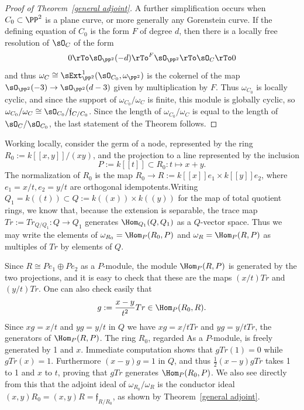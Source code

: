 \begin{proof}[Proof of Theorem~\ref{general adjoint}]
A further simplification occurs when $C_0\subset \PP^2$ is a plane curve, or more generally any 
Gorenstein curve.
If the defining equation of 
$C_0$ is the form $F$ of degree $d$, then there is a locally free resolution of  $\sO_C$ of the form
$$
0\rTo \sO_{\PP^2}(-d) \rTo^F \sO_{\PP^2} \rTo \sO_C \rTo 0
$$
and thus $\omega_C \cong \sExt^1_{\PP^2}(\sO_{C_0}, \omega_{\PP^2})$
is the cokernel of the map $\sO_{\PP^2}(-3) \to \sO_{\PP^2}(d-3)$ given by multiplication by $F$. Thus
$\omega_{C_0}$ is locally cyclic, and  since the support of $\omega_{C_0}/\omega_C$ is finite, this module is
 globally cyclic, so
$\omega_{C_0}/\omega_C \cong \sO_{C_0}/\mathfrak f_{C/C_0}$.
Since the length of $\omega_{C_0}/\omega_C$ is equal to the length of 
$\sO_{C}/\sO_{C_0}$, the last statement of the Theorem follows.
\end{proof}

\begin{example}
 Working locally, consider the germ of a node, represented by the ring $R_0:= k[[x,y]]/(xy)$, and
 the projection to a line represented by the inclusion 
 $$
 P:= k[[t]] \subset R_0: t\mapsto x+y.
 $$
 The normalization of $R_0$ is the map $R_0 \to R := k[[x]]e_1\times k[[y]]e_2$,
 where $e_1= x/t, e_2= y/t$ are orthogonal idempotents.Writing 
 $Q_1 = k((t)) \subset Q:= k((x))\times k((y))$
 for the map of total quotient rings, we know that, because the extension is separable, the trace map
 $Tr := Tr_{Q/Q_1}: Q \to Q_1$ generates $\Hom_{Q_1}(Q,Q_1)$ as a $Q$-vector space. Thus we may write the
 elements of $\omega_{R_0} = \Hom_{P}(R_0,P)$ and $\omega_R = \Hom_{P}(R,P)$ as
 multiples of $Tr$ by elements of $Q$.
 
 Since $R \cong Pe_1\oplus Pe_2$ as a $P$-module, the module $\Hom_P(R,P)$ is
 generated by the two projections, and it is easy to check that these are the maps
 $(x/t)Tr$ and $(y/t)Tr$. One can also check easily that 
 $$
 g := \frac{x-y}{t^2} Tr \in \Hom_P(R_0,R).
 $$
 Since
$xg = x/t$ and $yg = y/t$ in $Q$ we have
 $xg = x/tTr$ and $yg= y/tTr$, the generators of $\Hom_{P}(R,P)$. 
 The ring $R_0$, regarded As a $P$-module, is freely generated by 1 and $x$.
 Immediate computation shows that $gTr(1) = 0$ while $gTr(x) = 1$.
 Furthermore $(x-y)g = 1$ in $Q$,  and thus $\frac{1}{2}(x-y)gTr$ takes 1 to 1
 and $x$ to $t$, proving that $gTr$  generates
 $\Hom_P(R_0,P)$. We also see directly from this that the adjoint ideal
 of $\omega_{R_0}/\omega_R$ is the conductor ideal $(x,y)R_0 = (x,y)R = \mathfrak f_{R/R_0}$,
 as shown by  Theorem~\ref{general adjoint}. 
\end{example}

